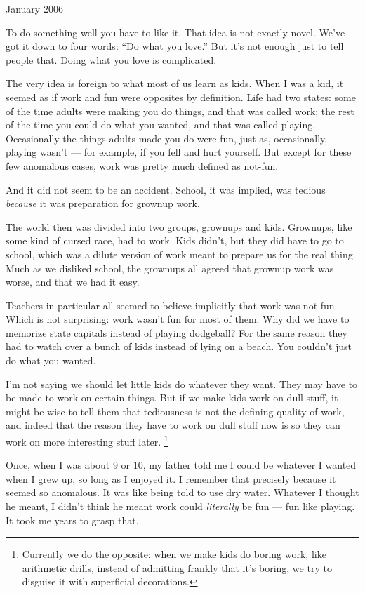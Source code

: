 \documentclass[12pt]{book}
\begin{document}
January 2006

To do something well you have to like it. That idea is not exactly
novel. We've got it down to four words: ``Do what you love.'' But it's
not enough just to tell people that. Doing what you love is complicated.

The very idea is foreign to what most of us learn as kids. When I was a
kid, it seemed as if work and fun were opposites by definition. Life had
two states: some of the time adults were making you do things, and that
was called work; the rest of the time you could do what you wanted, and
that was called playing. Occasionally the things adults made you do were
fun, just as, occasionally, playing wasn't --- for example, if you fell
and hurt yourself. But except for these few anomalous cases, work was
pretty much defined as not-fun.

And it did not seem to be an accident. School, it was implied, was
tedious \emph{because} it was preparation for grownup work.

The world then was divided into two groups, grownups and kids. Grownups,
like some kind of cursed race, had to work. Kids didn't, but they did
have to go to school, which was a dilute version of work meant to
prepare us for the real thing. Much as we disliked school, the grownups
all agreed that grownup work was worse, and that we had it easy.

Teachers in particular all seemed to believe implicitly that work was
not fun. Which is not surprising: work wasn't fun for most of them. Why
did we have to memorize state capitals instead of playing dodgeball? For
the same reason they had to watch over a bunch of kids instead of lying
on a beach. You couldn't just do what you wanted.

I'm not saying we should let little kids do whatever they want. They may
have to be made to work on certain things. But if we make kids work on
dull stuff, it might be wise to tell them that tediousness is not the
defining quality of work, and indeed that the reason they have to work
on dull stuff now is so they can work on more interesting stuff later.
\footnote{Currently we do the opposite: when we make kids do boring work,
like arithmetic drills, instead of admitting frankly that it's boring,
we try to disguise it with superficial decorations.}

Once, when I was about 9 or 10, my father told me I could be whatever I
wanted when I grew up, so long as I enjoyed it. I remember that
precisely because it seemed so anomalous. It was like being told to use
dry water. Whatever I thought he meant, I didn't think he meant work
could \emph{literally} be fun --- fun like playing. It took me years to
grasp that.
\end{document}
